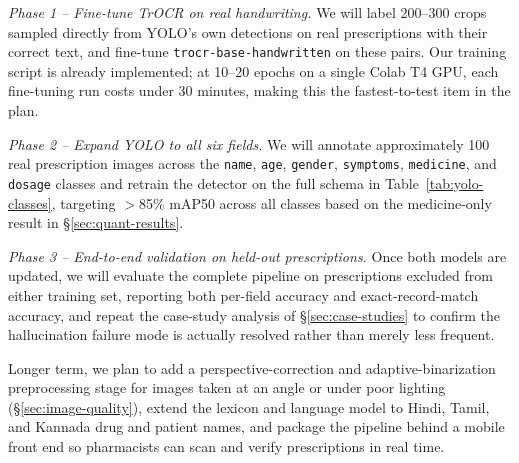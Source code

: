 \documentclass[conference]{IEEEtran}
\begin{document}
\textit{Phase 1 -- Fine-tune TrOCR on real handwriting.} We will label 200--300 crops sampled directly from YOLO's own detections on real prescriptions with their correct text, and fine-tune \texttt{trocr-base-handwritten} on these pairs. Our training script is already implemented; at 10--20 epochs on a single Colab T4 GPU, each fine-tuning run costs under 30 minutes, making this the fastest-to-test item in the plan.

\textit{Phase 2 -- Expand YOLO to all six fields.} We will annotate approximately 100 real prescription images across the \texttt{name}, \texttt{age}, \texttt{gender}, \texttt{symptoms}, \texttt{medicine}, and \texttt{dosage} classes and retrain the detector on the full schema in Table~\ref{tab:yolo-classes}, targeting $>$85\% mAP50 across all classes based on the medicine-only result in \S\ref{sec:quant-results}.

\textit{Phase 3 -- End-to-end validation on held-out prescriptions.} Once both models are updated, we will evaluate the complete pipeline on prescriptions excluded from either training set, reporting both per-field accuracy and exact-record-match accuracy, and repeat the case-study analysis of \S\ref{sec:case-studies} to confirm the hallucination failure mode is actually resolved rather than merely less frequent.

Longer term, we plan to add a perspective-correction and adaptive-binarization preprocessing stage for images taken at an angle or under poor lighting (\S\ref{sec:image-quality}), extend the lexicon and language model to Hindi, Tamil, and Kannada drug and patient names, and package the pipeline behind a mobile front end so pharmacists can scan and verify prescriptions in real time.



\end{document}
